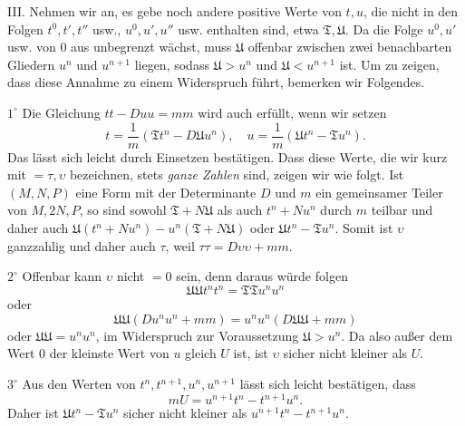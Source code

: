 III. Nehmen wir an, es gebe noch andere positive Werte von \(t,u\), die nicht in den Folgen \(t^0,t',t''\) usw., \(u^0,u',u''\) usw. enthalten sind, etwa \(\mathfrak{T},\mathfrak{U}\). Da die Folge \(u^0,u'\) usw. von \(0\) aus unbegrenzt wächst, muss \(\mathfrak{U}\) offenbar zwischen zwei benachbarten Gliedern \(u^n\) und \(u^{n+1}\) liegen, sodass \(\mathfrak{U}>u^n\) und \(\mathfrak{U}<u^{n+1}\) ist. Um zu zeigen, dass diese Annahme zu einem Widerspruch führt, bemerken wir Folgendes.

\(1^\circ\) Die Gleichung \(tt-Duu=mm\) wird auch erfüllt, wenn wir setzen
\[
t=\frac1m(\mathfrak{T}t^n-D\mathfrak{U}u^n),\quad u=\frac1m(\mathfrak{U}t^n-\mathfrak{T}u^n).
\]
Das lässt sich leicht durch Einsetzen bestätigen. Dass diese Werte, die wir kurz mit \(=\tau,\upsilon\) bezeichnen, stets \textit{ganze Zahlen} sind, zeigen wir wie folgt. Ist \((M,N,P)\) eine Form mit der Determinante \(D\) und \(m\) ein gemeinsamer Teiler von \(M,2N,P\), so sind sowohl \(\mathfrak{T}+N\mathfrak{U}\) als auch \(t^n+Nu^n\) durch \(m\) teilbar und daher auch \(\mathfrak{U}(t^n+Nu^n)-u^n(\mathfrak{T}+N\mathfrak{U})\) oder \(\mathfrak{U}t^n-\mathfrak{T}u^n\). Somit ist \(\upsilon\) ganzzahlig und daher auch \(\tau\), weil \(\tau\tau=D\upsilon\upsilon+mm\).

\(2^\circ\) Offenbar kann \(\upsilon\) nicht \(=0\) sein, denn daraus würde folgen
\[
\mathfrak{UU}t^n t^n=\mathfrak{TT}u^n u^n
\]
oder
\[
\mathfrak{UU}(Du^n u^n+mm)=u^n u^n(D\mathfrak{UU}+mm)
\]
oder \(\mathfrak{UU}=u^n u^n\), im Widerspruch zur Voraussetzung \(\mathfrak{U}>u^n\). Da also außer dem Wert \(0\) der kleinste Wert von \(u\) gleich \(U\) ist, ist \(\upsilon\) sicher nicht kleiner als \(U\).

\(3^\circ\) Aus den Werten von \(t^n,t^{n+1},u^n,u^{n+1}\) lässt sich leicht bestätigen, dass
\[
mU=u^{n+1}t^n-t^{n+1}u^n.
\]
Daher ist \(\mathfrak{U}t^n-\mathfrak{T}u^n\) sicher nicht kleiner als \(u^{n+1}t^n-t^{n+1}u^n\).

